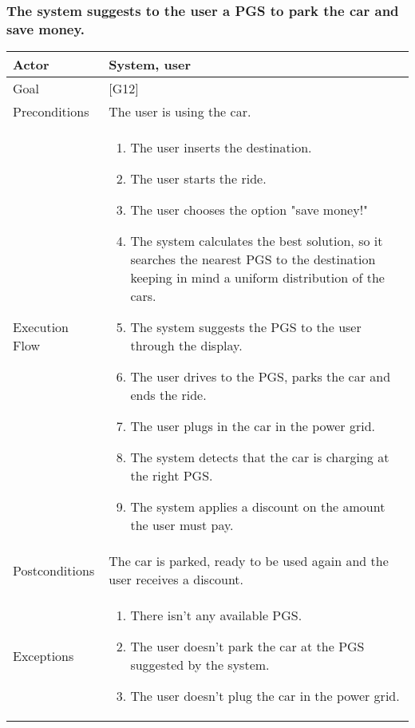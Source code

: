 \documentclass[english]{article}
\begin{document}
			\subsubsection{The system suggests to the user a PGS to park the car and save money.}
			\begin{tabularx}{\textwidth}{  l  X  }
				\hline
				Actor & System, user\\
				\hline
				Goal & [G12]\\
				\hline
				Preconditions & The user is using the car.\\
				\hline
				Execution Flow & \begin{enumerate}
					\item{The user inserts the destination.}
					\item{The user starts the ride.}
					\item{The user chooses the option "save money!"}
					\item{The system calculates the best solution, so it searches the nearest PGS to the destination keeping in mind a uniform distribution of the cars.}
					\item{The system suggests the PGS to the user through the display.}
					\item{The user drives to the PGS, parks the car and ends the ride.}
					\item{The user plugs in the car in the power grid.}
					\item{The system detects that the car is charging at the right PGS.}
					\item{The system applies a discount on the amount the user must pay.}
				\end{enumerate}\\
				\hline
				Postconditions & The car is parked, ready to be used again and the user receives a discount.\\
				\hline
				Exceptions & \begin{enumerate}
					\item{There isn't any available PGS.}
					\item{The user doesn't park the car at the PGS suggested by the system.}
					\item{The user doesn't plug the car in the power grid.}
				\end{enumerate}\\
				\hline
			\end{tabularx}
			
\end{document}
